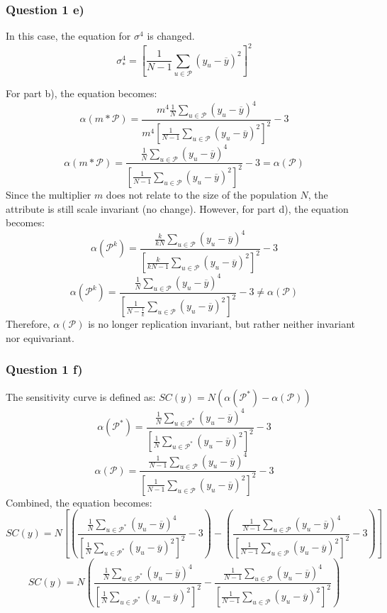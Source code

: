 \documentclass[
]{article}
\begin{document}
\newpage

\hypertarget{question-1-e}{%
\subsubsection{Question 1 e)}\label{question-1-e}}

In this case, the equation for \(\sigma^4\) is changed. \[
\sigma_*^4 = [\frac{1}{N-1}\sum_{u \in \mathcal{P}}(y_u-\overline y)^2]^2
\]

For part b), the equation becomes: \[
\alpha(m*\mathcal{P}) = \frac{m^4\frac{1}{N} \sum_{u \in \mathcal{P}}\left( y_u - \overline{y} \right)^4}{ m^4[\frac{1}{N-1}\sum_{u \in \mathcal{P}}(y_u-\overline y)^2]^2 }-3
\] \[
\alpha(m*\mathcal{P}) = \frac{\frac{1}{N} \sum_{u \in \mathcal{P}}\left( y_u - \overline{y} \right)^4}{[\frac{1}{N-1}\sum_{u \in \mathcal{P}}(y_u-\overline y)^2]^2 }-3 = \alpha(\mathcal{P})
\] Since the multiplier \(m\) does not relate to the size of the
population \(N\), the attribute is still scale invariant (no change).
However, for part d), the equation becomes: \[
\alpha(\mathcal{P}^k) = \frac{\frac{k}{kN} \sum_{u \in \mathcal{P}}\left( y_u -\overline{y} \right)^4}{ [\frac{k}{kN-1}\sum_{u \in \mathcal{P}}(y_u-\overline y)^2]^2 }-3
\] \[
\alpha(\mathcal{P}^k) = \frac{\frac{1}{N} \sum_{u \in \mathcal{P}}\left( y_u -\overline{y} \right)^4}{ [\frac{1}{N-\frac{1}{k}}\sum_{u \in \mathcal{P}}(y_u-\overline y)^2]^2 }-3 \ne \alpha(\mathcal{P})
\] Therefore, \(\alpha(\mathcal{P})\) is no longer replication
invariant, but rather neither invariant nor equivariant.

\newpage

\hypertarget{question-1-f}{%
\subsubsection{Question 1 f)}\label{question-1-f}}

The sensitivity curve is defined as:
\(SC(y) = N(\alpha(\mathcal{P}^*) - \alpha(\mathcal{P}))\) \[
\alpha(\mathcal{P}^*) = \frac{\frac{1}{N} \sum_{u \in \mathcal{P}^*}\left( y_u -\overline{y} \right)^4}{ [\frac{1}{N}\sum_{u \in \mathcal{P}^*}(y_u-\overline y)^2]^2 }-3
\] \[
\alpha(\mathcal{P}) = \frac{\frac{1}{N-1} \sum_{u \in \mathcal{P}}\left( y_u -\overline{y} \right)^4}{ [\frac{1}{N-1}\sum_{u \in \mathcal{P}}(y_u-\overline y)^2]^2 }-3
\] Combined, the equation becomes: \[
SC(y) = N[(\frac{\frac{1}{N} \sum_{u \in \mathcal{P}^*}\left( y_u -\overline{y} \right)^4}{ [\frac{1}{N}\sum_{u \in \mathcal{P}^*}(y_u-\overline y)^2]^2 }-3) - (\frac{\frac{1}{N-1} \sum_{u \in \mathcal{P}}\left( y_u -\overline{y} \right)^4}{ [\frac{1}{N-1}\sum_{u \in \mathcal{P}}(y_u-\overline y)^2]^2 }-3)]
\] \[
SC(y) = N(\frac{\frac{1}{N} \sum_{u \in \mathcal{P}^*}\left( y_u -\overline{y} \right)^4}{ [\frac{1}{N}\sum_{u \in \mathcal{P}^*}(y_u-\overline y)^2]^2 } - \frac{\frac{1}{N-1} \sum_{u \in \mathcal{P}}\left( y_u -\overline{y} \right)^4}{ [\frac{1}{N-1}\sum_{u \in \mathcal{P}}(y_u-\overline y)^2]^2 })
\]
\end{document}
